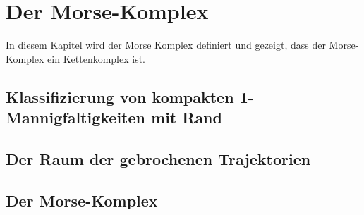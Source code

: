 \chapter{Der Morse-Komplex}

In diesem Kapitel wird der Morse Komplex definiert und gezeigt, dass der 
Morse-Komplex ein Kettenkomplex ist.

\section{Klassifizierung von kompakten 1-Mannigfaltigkeiten mit Rand}

\section{Der Raum der gebrochenen Trajektorien}

\section{Der Morse-Komplex}

